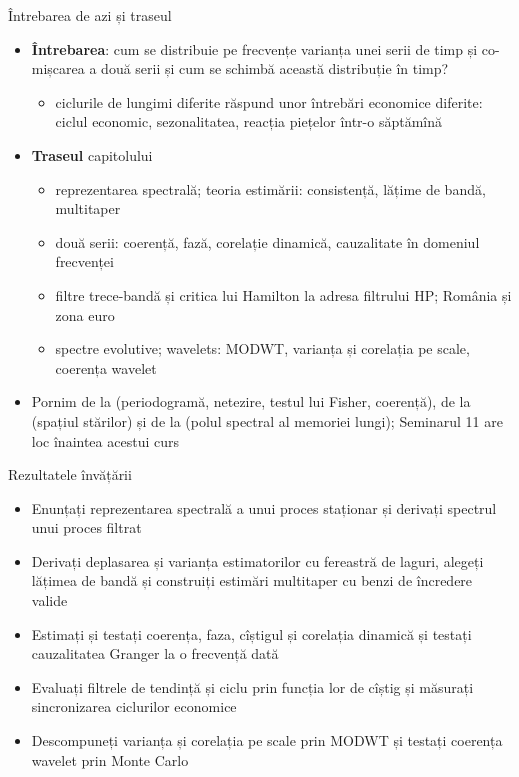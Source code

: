 \begin{frame}{Întrebarea de azi și traseul}
\itemsize{\small}
\begin{itemize}
    \item \textbf{Întrebarea}: cum se distribuie pe frecvențe varianța unei serii de timp și co-mișcarea a două serii și cum se schimbă această distribuție în timp?
    \begin{itemize}
        \item ciclurile de lungimi diferite răspund unor întrebări economice diferite: ciclul economic, sezonalitatea, reacția piețelor într-o săptămînă
    \end{itemize}
    \item \textbf{Traseul} capitolului
    \begin{itemize}
        \item reprezentarea spectrală; teoria estimării: consistență, lățime de bandă, multitaper
        \item două serii: coerență, fază, corelație dinamică, cauzalitate în domeniul frecvenței
        \item filtre trece-bandă și critica lui Hamilton la adresa filtrului HP; România și zona euro
        \item spectre evolutive; wavelets: MODWT, varianța și corelația pe scale, coerența wavelet
    \end{itemize}
    \item Pornim de la  (periodogramă, netezire, testul lui Fisher, coerență), de la  (spațiul stărilor) și de la  (polul spectral al memoriei lungi); Seminarul 11 are loc înaintea acestui curs
\end{itemize}
\end{frame}

\begin{frame}{Rezultatele învățării}
\itemsize{\small}
\begin{itemize}
    \item Enunțați reprezentarea spectrală a unui proces staționar și derivați spectrul unui proces filtrat
    \item Derivați deplasarea și varianța estimatorilor cu fereastră de laguri, alegeți lățimea de bandă și construiți estimări multitaper cu benzi de încredere valide
    \item Estimați și testați coerența, faza, cîștigul și corelația dinamică și testați cauzalitatea Granger la o frecvență dată
    \item Evaluați filtrele de tendință și ciclu prin funcția lor de cîștig și măsurați sincronizarea ciclurilor economice
    \item Descompuneți varianța și corelația pe scale prin MODWT și testați coerența wavelet prin Monte Carlo
\end{itemize}
\end{frame}

